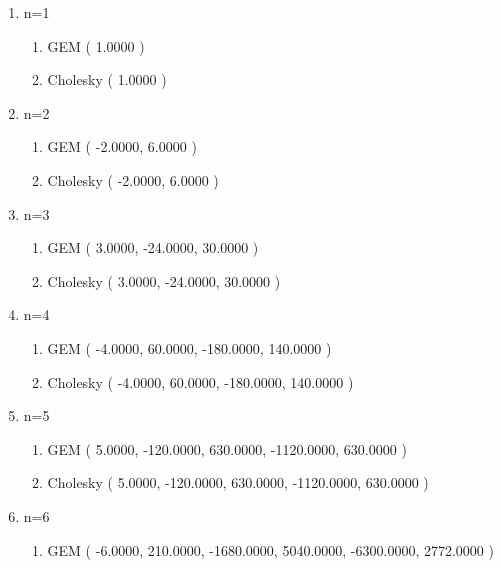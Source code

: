 		\begin{enumerate}
			\item n=1
			\begin{enumerate}
				\item GEM\newline
				( 1.0000 )
				\item Cholesky\newline
				( 1.0000 )
			\end{enumerate}
			\item n=2
			\begin{enumerate}
				\item GEM\newline
				( -2.0000, 6.0000 )
				\item Cholesky\newline
				( -2.0000, 6.0000 )
			\end{enumerate}
			\item n=3
			\begin{enumerate}
				\item GEM\newline
				( 3.0000, -24.0000, 30.0000 )
				\item Cholesky\newline
				( 3.0000, -24.0000, 30.0000 )
			\end{enumerate}
			\item n=4
			\begin{enumerate}
				\item GEM\newline
				( -4.0000, 60.0000, -180.0000, 140.0000 )
				\item Cholesky\newline
				( -4.0000, 60.0000, -180.0000, 140.0000 )
			\end{enumerate}
			\item n=5
			\begin{enumerate}
				\item GEM\newline
				( 5.0000, -120.0000, 630.0000, -1120.0000, 630.0000 )
				\item Cholesky\newline
				( 5.0000, -120.0000, 630.0000, -1120.0000, 630.0000 )
			\end{enumerate}
			\item n=6
			\begin{enumerate}
				\item GEM\newline
				( -6.0000, 210.0000, -1680.0000, 5040.0000, -6300.0000, 2772.0000 )

\end{enumerate}
\end{enumerate}
